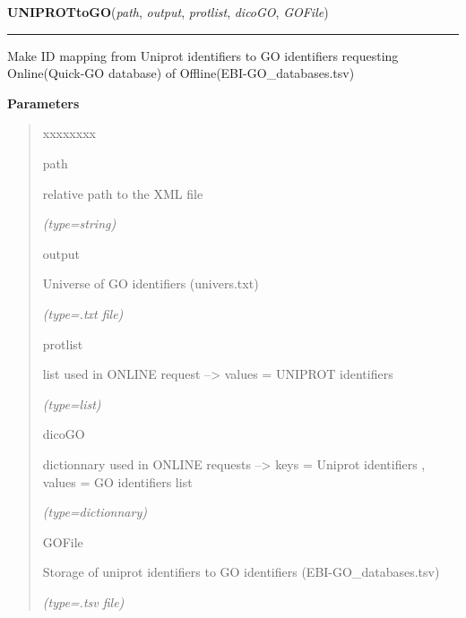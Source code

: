 \hspace{.8\funcindent}\begin{boxedminipage}{\funcwidth}

    \raggedright \textbf{UNIPROTtoGO}(\textit{path}, \textit{output}, \textit{protlist}, \textit{dicoGO}, \textit{GOFile})

    \vspace{-1.5ex}

    \rule{\textwidth}{0.5\fboxrule}
\setlength{\parskip}{2ex}
    Make ID mapping from Uniprot identifiers to GO identifiers requesting 
    Online(Quick-GO database) of Offline(EBI-GO\_databases.tsv)

\setlength{\parskip}{1ex}
      \textbf{Parameters}
      \vspace{-1ex}

      \begin{quote}
        \begin{Ventry}{xxxxxxxx}

          \item[path]

          relative path to the XML file

            {\it (type=string)}

          \item[output]

          Universe of GO identifiers (univers.txt)

            {\it (type=.txt file)}

          \item[protlist]

          list used in ONLINE request --{\textgreater} values = UNIPROT 
          identifiers

            {\it (type=list)}

          \item[dicoGO]

          dictionnary used in ONLINE requests --{\textgreater} keys = 
          Uniprot identifiers , values = GO identifiers list

            {\it (type=dictionnary)}

          \item[GOFile]

          Storage of uniprot identifiers to GO identifiers 
          (EBI-GO\_databases.tsv)

            {\it (type=.tsv file)}

        \end{Ventry}

      \end{quote}

    \end{boxedminipage}

